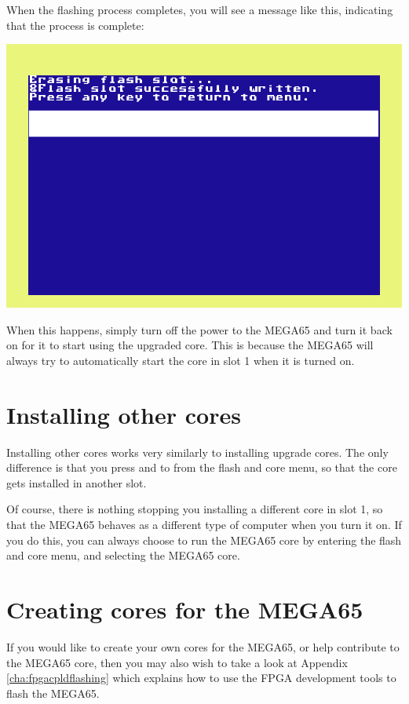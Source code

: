 When the flashing process completes, you will see a message like this, indicating that the process is complete:

\includegraphics[width=\linewidth]{images/ss-flashmenu-done.png}


When this happens, simply turn off the power to the MEGA65 and turn it back on for it to start using the
upgraded core.  This is because the MEGA65 will always try to automatically start the core in slot 1 when
it is turned on.

\section{Installing other cores}

Installing other cores works very similarly to installing upgrade cores. The only difference is that you
press  and  to  from the flash and core menu, so that the core
gets installed in another slot.

Of course, there is nothing stopping you installing a different core
in slot 1, so that the MEGA65 behaves as a different type of computer when you turn it on.  If you do this,
you can always choose to run the MEGA65 core by entering the flash and core menu,  and selecting the MEGA65
core.

\section{Creating cores for the MEGA65}

If you would like to create your own cores for the MEGA65, or help contribute to the MEGA65 core, then
you may also wish to take a look at Appendix \ref{cha:fpgacpldflashing} which explains how to use the
FPGA development tools to flash the MEGA65.

